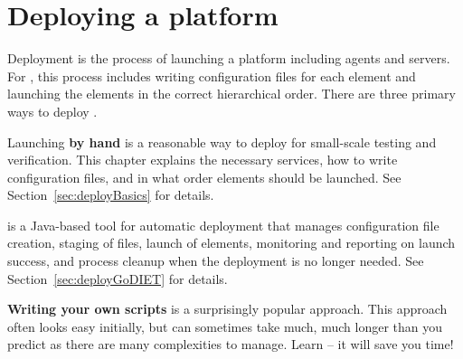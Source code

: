 
\chapter{Deploying a \diet platform}
\label{ch:deploying}

Deployment is the process of launching a \diet platform including agents and
servers.  For \diet, this process includes writing configuration files for each
element and launching the elements in the correct hierarchical order. There are
three primary ways to deploy \diet.

Launching \textbf{by hand} is a reasonable way to deploy \diet for small-scale
testing and verification. This chapter explains the  necessary services, how to
write \diet configuration files, and in what order \diet elements should be
launched.  See Section~\ref{sec:deployBasics} for details.

\textbf{\godiet} is a Java-based tool for automatic \diet deployment that
manages configuration file creation, staging of files, launch of elements,
monitoring and reporting on launch success, and process cleanup when the \diet
deployment is no longer needed.   See  Section~\ref{sec:deployGoDIET} for
details.

\textbf{Writing your own scripts} is a surprisingly popular approach.  This
approach often looks easy initially, but can sometimes take much, much longer
than you predict as there are many complexities to manage.  Learn \godiet -- it
will save you time!



